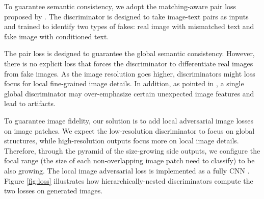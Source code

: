 \documentclass[10pt,twocolumn,letterpaper]{article}
\begin{document}
To guarantee semantic consistency, we adopt the matching-aware pair loss proposed by \cite{reed2016generative}. The discriminator is designed to take image-text pairs as inputs and trained to identify two types of fakes: real image with mismatched text and fake image with conditioned text.

The pair loss is designed to guarantee the global semantic consistency. However, there is no explicit loss that forces the discriminator to differentiate real images from fake images. As the image resolution goes higher, discriminators might loss focus for local fine-grained image details.
In addition, as pointed in \cite{shrivastava2016learning}, a single global discriminator may over-emphasize certain unexpected image features and lead to artifacts. 

To guarantee image fidelity, our solution is to add local adversarial image losses on image patches. 
%
We expect the low-resolution discriminator to focus on global structures, while high-resolution outputs focus more on local image details. Therefore, through the pyramid of the size-growing side outputs, we configure the focal range (the size of each non-overlapping image patch need to classify) to be also growing.
The local image adversarial loss is implemented as a fully CNN \cite{shrivastava2016learning,zhu2017unpaired}.  
Figure \ref{fig:loss} illustrates how hierarchically-nested discriminators compute the two losses on generated images. 
\end{document}
